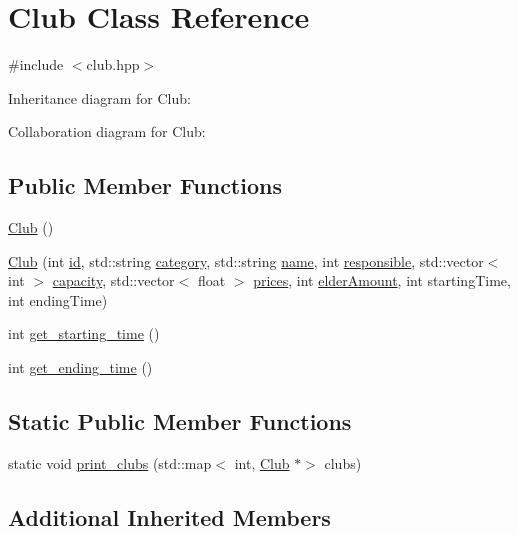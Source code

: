 \hypertarget{class_club}{}\section{Club Class Reference}
\label{class_club}


{\ttfamily \#include $<$club.\+hpp$>$}



Inheritance diagram for Club\+:


Collaboration diagram for Club\+:
\subsection*{Public Member Functions}
\begin{DoxyCompactItemize}
\item 
\hyperlink{class_club_a0c3852dcc026792a5b3df86ac3cde541}{Club} ()
\item 
\hyperlink{class_club_a5b5602cb997e5c431840dda3ce9dad8d}{Club} (int \hyperlink{class_event_a08ba599a781bea8b678251fdb7290890}{id}, std\+::string \hyperlink{class_event_a5634221828f8d3f823598b1fa22e3392}{category}, std\+::string \hyperlink{class_event_ae116bf76fb01a92e000579a5a0d6f35c}{name}, int \hyperlink{class_event_aab3e742a3f882731bd73996f4c66eef1}{responsible}, std\+::vector$<$ int $>$ \hyperlink{class_event_a75eb887870ee5c4a4bf502d98a7cd6a3}{capacity}, std\+::vector$<$ float $>$ \hyperlink{class_event_a49d863913759f2294cc4c8bdbc2be9fe}{prices}, int \hyperlink{class_adult_event_a4c3a51c94f97eff72e54530399955aa0}{elder\+Amount}, int starting\+Time, int ending\+Time)
\item 
int \hyperlink{class_club_af4268a65e89b9bc9e4d8bb6ea4d46605}{get\+\_\+starting\+\_\+time} ()
\item 
int \hyperlink{class_club_a3dfbcb50e77a48ae0f510f6ff7b7734c}{get\+\_\+ending\+\_\+time} ()
\end{DoxyCompactItemize}
\subsection*{Static Public Member Functions}
\begin{DoxyCompactItemize}
\item 
static void \hyperlink{class_club_aaf9725356f46fd58d1f6a83bed6edc00}{print\+\_\+clubs} (std\+::map$<$ int, \hyperlink{class_club}{Club} $\ast$$>$ clubs)
\end{DoxyCompactItemize}
\subsection*{Additional Inherited Members}


